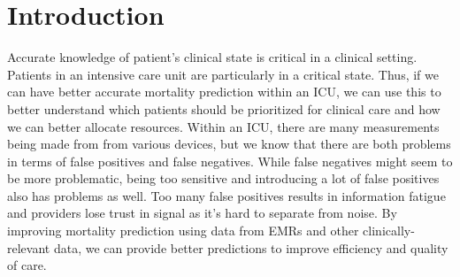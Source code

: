 \documentclass[12pt, final]{article}
\begin{document}
\section{Introduction} \label{Introduction}
Accurate knowledge of patient's clinical state is critical in a clinical setting. Patients in an intensive care unit are particularly in a critical state. Thus, if we can have better accurate mortality prediction within an ICU, we can use this to better understand which patients should be prioritized for clinical care and how we can better allocate resources. Within an ICU, there are many measurements being made from from various devices, but we know that there are both problems in terms of false positives and false negatives. While false negatives might seem to be more problematic, being too sensitive and introducing a lot of false positives also has problems as well. Too many false positives results in information fatigue and providers lose trust in signal as it's hard to separate from noise. By improving mortality prediction using data from EMRs and other clinically-relevant data, we can provide better predictions to improve efficiency and quality of care.
\end{document}
